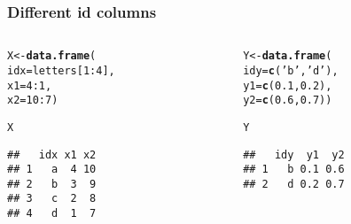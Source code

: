 \documentclass[12pt]{beamer}\usepackage[]{graphicx}\usepackage[]{color}
\makeatletter
\newcommand{\hlnum}[1]{\textcolor[rgb]{0.686,0.059,0.569}{#1}}%
\newcommand{\hlstr}[1]{\textcolor[rgb]{0.192,0.494,0.8}{#1}}%
\newcommand{\hlopt}[1]{\textcolor[rgb]{0,0,0}{#1}}%
\newcommand{\hlstd}[1]{\textcolor[rgb]{0.345,0.345,0.345}{#1}}%
\newcommand{\hlkwb}[1]{\textcolor[rgb]{0.69,0.353,0.396}{#1}}%
\newcommand{\hlkwc}[1]{\textcolor[rgb]{0.333,0.667,0.333}{#1}}%
\newcommand{\hlkwd}[1]{\textcolor[rgb]{0.737,0.353,0.396}{\textbf{#1}}}%
\newenvironment{kframe}{%
 \def\at@end@of@kframe{}%
 \ifinner\ifhmode%
  \def\at@end@of@kframe{\end{minipage}}%
  \begin{minipage}{\columnwidth}%
 \fi\fi%
 \def\FrameCommand##1{\hskip\@totalleftmargin \hskip-\fboxsep
 \colorbox{shadecolor}{##1}\hskip-\fboxsep
     \hskip-\linewidth \hskip-\@totalleftmargin \hskip\columnwidth}%
 \MakeFramed {\advance\hsize-\width
   \@totalleftmargin\z@ \linewidth\hsize
   \@setminipage}}%
 {\par\unskip\endMakeFramed%
 \at@end@of@kframe}
\newenvironment{knitrout}{}{} %
\makeatother
\begin{document}

\begin{frame}[fragile]
\frametitle{Different id columns}

\begin{columns}[t]
\begin{column}{0.4\textwidth}
\begin{knitrout}\footnotesize
{}\color{fgcolor}\begin{kframe}
\begin{alltt}
\hlstd{X} \hlkwb{<-} \hlkwd{data.frame}\hlstd{(}
  \hlkwc{idx} \hlstd{= letters[}\hlnum{1}\hlopt{:}\hlnum{4}\hlstd{],}
  \hlkwc{x1} \hlstd{=} \hlnum{4}\hlopt{:}\hlnum{1}\hlstd{,}
  \hlkwc{x2} \hlstd{=} \hlnum{10}\hlopt{:}\hlnum{7}\hlstd{)}

\hlstd{X}
\end{alltt}
\begin{verbatim}
##   idx x1 x2
## 1   a  4 10
## 2   b  3  9
## 3   c  2  8
## 4   d  1  7
\end{verbatim}
\end{kframe}
\end{knitrout}
\end{column}

\begin{column}{0.5\textwidth}
\begin{knitrout}\footnotesize
{}\color{fgcolor}\begin{kframe}
\begin{alltt}
\hlstd{Y} \hlkwb{<-} \hlkwd{data.frame}\hlstd{(}
  \hlkwc{idy} \hlstd{=} \hlkwd{c}\hlstd{(}\hlstr{'b'}\hlstd{,} \hlstr{'d'}\hlstd{),}
  \hlkwc{y1} \hlstd{=} \hlkwd{c}\hlstd{(}\hlnum{0.1}\hlstd{,} \hlnum{0.2}\hlstd{),}
  \hlkwc{y2} \hlstd{=} \hlkwd{c}\hlstd{(}\hlnum{0.6}\hlstd{,} \hlnum{0.7}\hlstd{))}

\hlstd{Y}
\end{alltt}
\begin{verbatim}
##   idy  y1  y2
## 1   b 0.1 0.6
## 2   d 0.2 0.7
\end{verbatim}
\end{kframe}
\end{knitrout}
\end{column}
\end{columns}

\end{frame}

\end{document}
